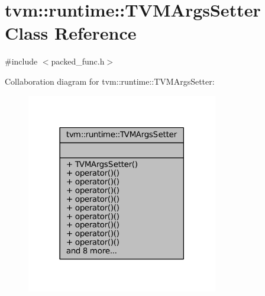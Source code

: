 \hypertarget{classtvm_1_1runtime_1_1TVMArgsSetter}{}\section{tvm\+:\+:runtime\+:\+:T\+V\+M\+Args\+Setter Class Reference}
\label{classtvm_1_1runtime_1_1TVMArgsSetter}


{\ttfamily \#include $<$packed\+\_\+func.\+h$>$}



Collaboration diagram for tvm\+:\+:runtime\+:\+:T\+V\+M\+Args\+Setter\+:
\nopagebreak
\begin{figure}[H]
\begin{center}
\leavevmode
\includegraphics[width=237pt]{classtvm_1_1runtime_1_1TVMArgsSetter__coll__graph}
\end{center}
\end{figure}
